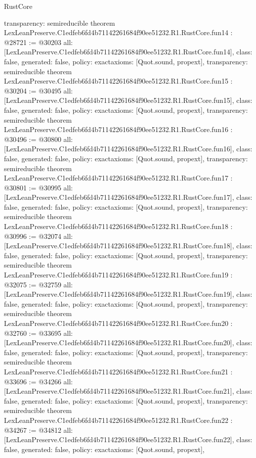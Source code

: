 \begin{lexlean}{RustCore}
\begin{coremodule}
{  transparency: semireducible
}
theorem LexLeanPreserve.C1edfeb6fd4b71142261684f90ee51232.R1.RustCore.fun14 : @28721 := @30203 {
  all: [LexLeanPreserve.C1edfeb6fd4b71142261684f90ee51232.R1.RustCore.fun14],
  class: false,
  generated: false,
  policy: exact{axioms: [Quot.sound, propext]},
  transparency: semireducible
}
theorem LexLeanPreserve.C1edfeb6fd4b71142261684f90ee51232.R1.RustCore.fun15 : @30204 := @30495 {
  all: [LexLeanPreserve.C1edfeb6fd4b71142261684f90ee51232.R1.RustCore.fun15],
  class: false,
  generated: false,
  policy: exact{axioms: [Quot.sound, propext]},
  transparency: semireducible
}
theorem LexLeanPreserve.C1edfeb6fd4b71142261684f90ee51232.R1.RustCore.fun16 : @30496 := @30800 {
  all: [LexLeanPreserve.C1edfeb6fd4b71142261684f90ee51232.R1.RustCore.fun16],
  class: false,
  generated: false,
  policy: exact{axioms: [Quot.sound, propext]},
  transparency: semireducible
}
theorem LexLeanPreserve.C1edfeb6fd4b71142261684f90ee51232.R1.RustCore.fun17 : @30801 := @30995 {
  all: [LexLeanPreserve.C1edfeb6fd4b71142261684f90ee51232.R1.RustCore.fun17],
  class: false,
  generated: false,
  policy: exact{axioms: [Quot.sound, propext]},
  transparency: semireducible
}
theorem LexLeanPreserve.C1edfeb6fd4b71142261684f90ee51232.R1.RustCore.fun18 : @30996 := @32074 {
  all: [LexLeanPreserve.C1edfeb6fd4b71142261684f90ee51232.R1.RustCore.fun18],
  class: false,
  generated: false,
  policy: exact{axioms: [Quot.sound, propext]},
  transparency: semireducible
}
theorem LexLeanPreserve.C1edfeb6fd4b71142261684f90ee51232.R1.RustCore.fun19 : @32075 := @32759 {
  all: [LexLeanPreserve.C1edfeb6fd4b71142261684f90ee51232.R1.RustCore.fun19],
  class: false,
  generated: false,
  policy: exact{axioms: [Quot.sound, propext]},
  transparency: semireducible
}
theorem LexLeanPreserve.C1edfeb6fd4b71142261684f90ee51232.R1.RustCore.fun20 : @32760 := @33695 {
  all: [LexLeanPreserve.C1edfeb6fd4b71142261684f90ee51232.R1.RustCore.fun20],
  class: false,
  generated: false,
  policy: exact{axioms: [Quot.sound, propext]},
  transparency: semireducible
}
theorem LexLeanPreserve.C1edfeb6fd4b71142261684f90ee51232.R1.RustCore.fun21 : @33696 := @34266 {
  all: [LexLeanPreserve.C1edfeb6fd4b71142261684f90ee51232.R1.RustCore.fun21],
  class: false,
  generated: false,
  policy: exact{axioms: [Quot.sound, propext]},
  transparency: semireducible
}
theorem LexLeanPreserve.C1edfeb6fd4b71142261684f90ee51232.R1.RustCore.fun22 : @34267 := @34812 {
  all: [LexLeanPreserve.C1edfeb6fd4b71142261684f90ee51232.R1.RustCore.fun22],
  class: false,
  generated: false,
  policy: exact{axioms: [Quot.sound, propext]},
}
\end{coremodule}
\end{lexlean}
